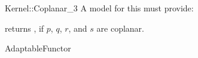 \begin{ccRefFunctionObjectConcept}{Kernel::Coplanar_3}
A model for this must provide:


{returns , if $p$, $q$, $r$, and $s$ are coplanar.}

\ccRefines
AdaptableFunctor

\ccSeeAlso
{}\\

\end{ccRefFunctionObjectConcept}

